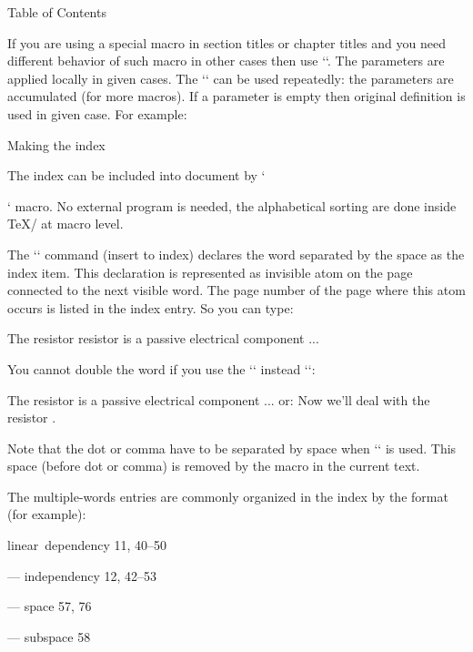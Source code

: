 {\begtt
\nonum\notoc\sec Table of Contents
\endtt

\new
If you are using a special macro in section titles or chapter titles 
and you need different behavior of such macro in other cases then use 
``.
The parameters are applied locally in given cases. The `\regmacro` can be
used repeatedly: the parameters are accumulated (for more macros). 
If a parameter is empty then original definition is used in given case.
For example:

\begtt
\def\mylogo{\leavevmode\hbox{\Red{\it My}\Black{\setfontsize{mag1.5}\rm Lo}Go}}
\regmacro {\def\mylogo{\hbox{\Red My\Black LoGo}}} %
          {\def\mylogo{\hbox{{\it My}\/LoGo}}}     %
          {\def\mylogo{MyLoGo}}                    %
\endtt

\secc Making the index 

The index can be included into document by `\makeindex` macro. No external
program is needed, the alphabetical sorting are done inside \TeX/ at macro
level.

The `\ii` command (insert to index) declares the word separated by the space
as the index item. This declaration is represented as invisible atom on the
page connected to the next visible word. The page number of the page where
this atom occurs is listed in the index entry. So you can type:

\begtt
The \ii resistor resistor is a passive electrical component ...
\endtt

You cannot double the word if you use the `\iid` instead `\ii`:

\begtt
The \iid resistor is a passive electrical component ...
or:
Now we'll deal with the \iid resistor .
\endtt

Note that the dot or comma have to be separated by space when `\iid` is
used. This space (before dot or comma) is removed by the macro in 
the current text.

The multiple-words entries are commonly organized in the index by the format
(for example): 

\medskip

linear~dependency  11, 40--50

--- independency 12, 42--53

--- space 57, 76

--- subspace 58

}
